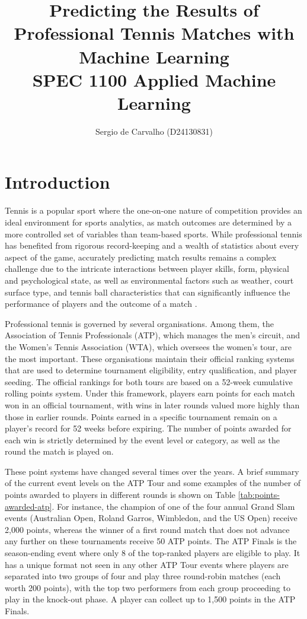 \documentclass[11pt, oneside]{article}
\title{Predicting the Results of Professional Tennis Matches with Machine Learning\\
    [1em]\small{SPEC 1100 Applied Machine Learning}}
\author{Sergio de Carvalho (D24130831)}
\begin{document}
\maketitle

\section{Introduction}

Tennis is a popular sport where the one-on-one nature of competition provides an ideal environment
for sports analytics, as match outcomes are determined by a more controlled set of variables than
team-based sports. While professional tennis has benefited from rigorous record-keeping and a wealth
of statistics about every aspect of the game,
accurately predicting match results remains a complex challenge due to the intricate interactions
between player skills, form, physical and psychological state, as well as environmental factors
such as weather, court surface type, and tennis ball characteristics that can significantly
influence the performance of players and the outcome of a match \cite{knottenbelt_2012}.

Professional tennis is governed by several organisations. Among them, the Association of Tennis
Professionals (ATP), which manages the men's circuit, and the Women's Tennis Association (WTA),
which oversees the women's tour, are the most important. These organisations maintain their
official ranking systems that are used to determine tournament eligibility, entry qualification, and
player seeding. The official rankings for both tours are based on a 52-week cumulative rolling points
system. Under this framework, players earn points for each match won in an official tournament, with
wins in
later rounds valued more highly than those in earlier rounds. Points earned in a specific tournament
remain on a player's record for 52 weeks before expiring. The number of points awarded for each win
is strictly determined by the event level or category, as well as the round the match is played on.

These point systems have changed several times over the years. A brief summary of the current event
levels on the ATP Tour and some examples of the number of points awarded to players in different
rounds is shown on Table \ref{tab:points-awarded-atp}.
For instance, the champion of one of the four annual Grand Slam events (Australian Open, Roland
Garros, Wimbledon, and the US Open) receive 2,000 points, whereas the winner of a first round match
that does not advance any further on these tournaments receive 50 ATP points. The ATP Finals
is the season-ending event where only 8 of the top-ranked players are eligible to play. It has a
unique format not seen in any other ATP Tour events where players are separated into two groups of
four and play three round-robin matches (each worth 200 points), with the top two performers from
each group proceeding to play in the knock-out phase. A player can collect up to 1,500 points in the
ATP Finals.
\end{document}
